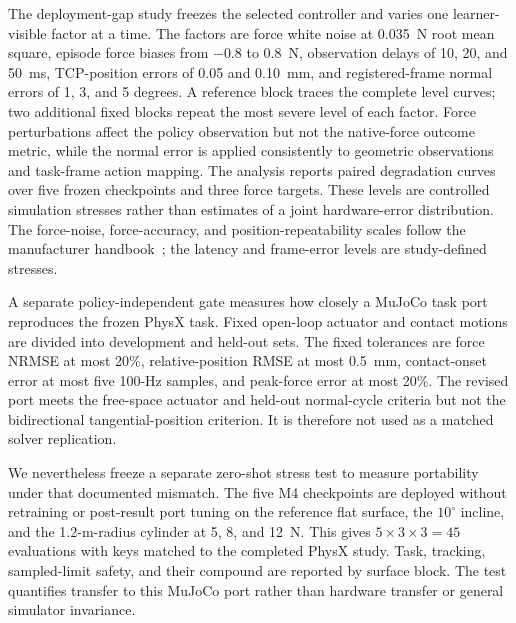 The deployment-gap study freezes the selected controller and varies one
learner-visible factor at a time. The factors are force white noise at
0.035~N root mean square, episode force biases from $-0.8$ to $0.8$~N,
observation delays of 10, 20, and 50~ms, TCP-position errors of 0.05 and
0.10~mm, and registered-frame normal errors of 1, 3, and 5 degrees. A
reference block traces the complete level curves; two additional fixed blocks
repeat the most severe level of each factor. Force perturbations affect the
policy observation but not the native-force outcome metric, while the normal
error is applied consistently to geometric observations and task-frame action
mapping. The analysis reports paired degradation curves over five frozen
checkpoints and three force targets. These levels are controlled simulation
stresses rather than estimates of a joint hardware-error distribution. The
force-noise, force-accuracy, and position-repeatability scales follow the
manufacturer handbook~\cite{franka2021handbook}; the latency and frame-error
levels are study-defined stresses.

A separate policy-independent gate measures how closely a MuJoCo task port
reproduces the frozen PhysX task. Fixed open-loop actuator and contact motions
are divided into development and held-out sets. The fixed tolerances are force
NRMSE at most 20\%, relative-position RMSE at most 0.5~mm, contact-onset error
at most five 100-Hz samples, and peak-force error at most 20\%. The revised
port meets the free-space actuator and held-out normal-cycle criteria but not
the bidirectional tangential-position criterion. It is therefore not used as
a matched solver replication.

We nevertheless freeze a separate zero-shot stress test to measure portability
under that documented mismatch. The five M4 checkpoints are deployed without
retraining or post-result port tuning on the reference flat surface, the
$10^\circ$ incline, and the 1.2-m-radius cylinder at 5, 8, and 12~N. This gives
$5\times3\times3=45$ evaluations with keys matched to the completed PhysX
study. Task, tracking, sampled-limit safety, and their compound are reported
by surface block. The test quantifies transfer to this MuJoCo port rather than
hardware transfer or general simulator invariance.
